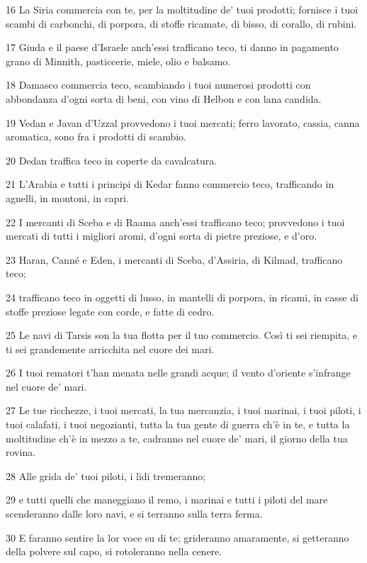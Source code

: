 \par 16 La Siria commercia con te, per la moltitudine de' tuoi prodotti; fornisce i tuoi scambi di carbonchi, di porpora, di stoffe ricamate, di bisso, di corallo, di rubini.
\par 17 Giuda e il paese d'Israele anch'essi trafficano teco, ti danno in pagamento grano di Minnith, pasticcerie, miele, olio e balsamo.
\par 18 Damasco commercia teco, scambiando i tuoi numerosi prodotti con abbondanza d'ogni sorta di beni, con vino di Helbon e con lana candida.
\par 19 Vedan e Javan d'Uzzal provvedono i tuoi mercati; ferro lavorato, cassia, canna aromatica, sono fra i prodotti di scambio.
\par 20 Dedan traffica teco in coperte da cavalcatura.
\par 21 L'Arabia e tutti i principi di Kedar fanno commercio teco, trafficando in agnelli, in montoni, in capri.
\par 22 I mercanti di Sceba e di Raama anch'essi trafficano teco; provvedono i tuoi mercati di tutti i migliori aromi, d'ogni sorta di pietre preziose, e d'oro.
\par 23 Haran, Canné e Eden, i mercanti di Sceba, d'Assiria, di Kilmad, trafficano teco;
\par 24 trafficano teco in oggetti di lusso, in mantelli di porpora, in ricami, in casse di stoffe preziose legate con corde, e fatte di cedro.
\par 25 Le navi di Tarsis son la tua flotta per il tuo commercio. Così ti sei riempita, e ti sei grandemente arricchita nel cuore dei mari.
\par 26 I tuoi rematori t'han menata nelle grandi acque; il vento d'oriente s'infrange nel cuore de' mari.
\par 27 Le tue ricchezze, i tuoi mercati, la tua mercanzia, i tuoi marinai, i tuoi piloti, i tuoi calafati, i tuoi negozianti, tutta la tua gente di guerra ch'è in te, e tutta la moltitudine ch'è in mezzo a te, cadranno nel cuore de' mari, il giorno della tua rovina.
\par 28 Alle grida de' tuoi piloti, i lidi tremeranno;
\par 29 e tutti quelli che maneggiano il remo, i marinai e tutti i piloti del mare scenderanno dalle loro navi, e si terranno sulla terra ferma.
\par 30 E faranno sentire la lor voce su di te; grideranno amaramente, si getteranno della polvere sul capo, si rotoleranno nella cenere.
